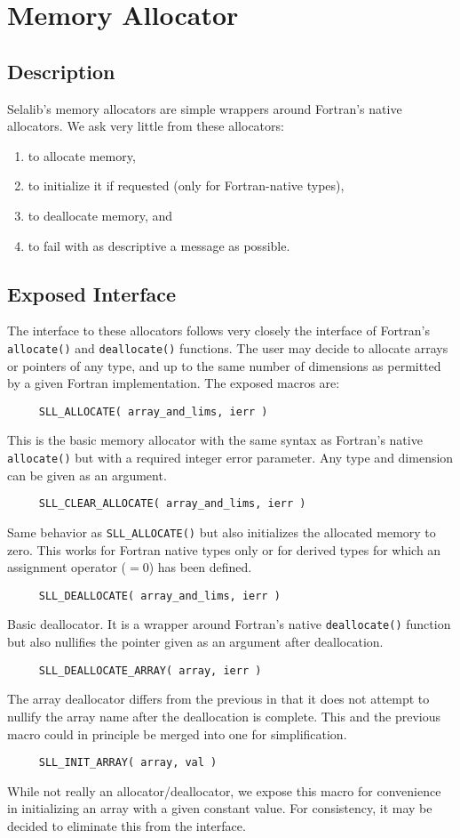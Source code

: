 \documentclass[]{report}   %
\begin{document}
\section{Memory Allocator}
\subsection{Description}
Selalib's memory allocators are simple wrappers around Fortran's native allocators. We ask very little from these allocators:
\begin{enumerate}
\item to allocate memory, 
\item to initialize it if requested (only for Fortran-native types), 
\item to deallocate memory, and 
\item to fail with as descriptive a message as possible.
\end{enumerate}

\subsection{Exposed Interface}
The interface to these allocators follows very closely the interface of Fortran's \verb+allocate()+ and \verb+deallocate()+ functions. The user may decide to allocate arrays or pointers of any type, and up to the same number of dimensions as permitted by a given Fortran implementation. The exposed macros are:

\begin{verbatim}
     SLL_ALLOCATE( array_and_lims, ierr )
\end{verbatim}
This is the basic memory allocator with the same syntax as Fortran's native \verb+allocate()+ but with a required integer error parameter. Any type and dimension can be given as an argument.

\begin{verbatim}
     SLL_CLEAR_ALLOCATE( array_and_lims, ierr )
\end{verbatim}
Same behavior as \verb+SLL_ALLOCATE()+ but also initializes the allocated memory to zero. This works for Fortran native types only or for derived types for which an assignment operator ($= 0$) has been defined.
\begin{verbatim}
     SLL_DEALLOCATE( array_and_lims, ierr )
\end{verbatim}
Basic deallocator. It is a wrapper around Fortran's native \verb+deallocate()+ function but also nullifies the pointer given as an argument after deallocation.
\begin{verbatim}
     SLL_DEALLOCATE_ARRAY( array, ierr )
\end{verbatim}
The array deallocator differs from the previous in that it does not attempt to nullify the array name after the deallocation is complete. This and the previous macro could in principle be merged into one for simplification.
\begin{verbatim}
     SLL_INIT_ARRAY( array, val )
\end{verbatim}
While not really an allocator/deallocator, we expose this macro for convenience in initializing an array with a given constant value. For consistency, it may be decided to eliminate this from the interface.
\end{document}
